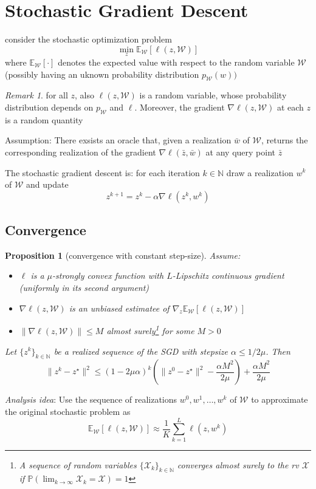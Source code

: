 \documentclass{book}
\newcommand{\N}{\mathbb{N}}
\theoremstyle{theoremv2}
\newtheorem{proposition}{Proposition}[chapter]
\theoremstyle{defv2}
\theoremstyle{remark}
\newtheorem*{remark}{Remark}
\theoremstyle{remark}
\theoremstyle{definition}
\theoremstyle{definition}
\begin{document}
\section{Stochastic Gradient Descent}
consider the stochastic optimization problem 
\[
    \min_z \mathbb{E}_{\mathcal{W}}[\ell(z,\mathcal{W})]
\]
where $\mathbb{E}_{\mathcal{W}}[\cdot]$ denotes the expected value with respect to the random variable $\mathcal{W}$ (possibly having an uknown probability distribution $p_{\mathcal{W}}(w))$
\begin{remark}
    for all $z$, also $\ell(z,\mathcal{W})$ is a random variable, whose probability distribution depends on $p_{\mathcal{W}}$ and $\ell$. Moreover, the gradient $\nabla\ell(z,\mathcal{W})$ at each $z$ is a random quantity
\end{remark}
Assumption: There exsists an oracle that, given a realization $\bar{w}$ of $\mathcal{W}$, returns the corresponding realization of the gradient $\nabla\ell(\bar{z},\bar{w})$ at any query point $\bar{z}$

The stochastic gradient descent is: for each iteration $k\in\N$ draw a realization $w^k$ of $\mathcal{W}$ and update 
\[
    z^{k+1} = z^k -\alpha\nabla\ell(z^k,w^k)
\]
\subsection{Convergence}
\begin{proposition}[convergence with constant step-size]
    Assume: 
    \begin{itemize}
        \item $\ell$ is a $\mu$-strongly convex function with $L$-Lipschitz continuous gradient (uniformly in its second argument)
        \item $\nabla\ell(z,\mathcal{W})$ is an unbiased estimatee of $\nabla_z\mathbb{E}_{\mathcal{W}}[\ell(z,\mathcal{W})]$
        \item $\|\nabla\ell(z,\mathcal{W})\|\leq M$ almost surely\footnote{A sequence of random variables $\{\mathcal{X}_k\}_{k\in\N}$ converges almost surely to the rv $\mathcal{X}$ if $\mathbb{P}(\lim_{k\to\infty}\mathcal{X}_k=\mathcal{X})=1$} for some $M>0$
    \end{itemize}
    Let $\{z^k\}_{k\in\N}$ be a realized sequence of the SGD with stepsize $\alpha\leq 1/2 \mu$. Then 
    \[
        \|z^k-z^\star\|^2\leq (1-2\mu\alpha)^k\left(\|z^0-z^\star\|^2 - \displaystyle\frac{\alpha M^2}{2\mu}\right) + \displaystyle\frac{\alpha M^2}{2\mu}
    \]
\end{proposition} 
\emph{Analysis idea}: Use the sequence of realizations $w^0,w^1,\dots,w^k$ of $\mathcal{W}$ to approximate the original stochastic problem as 
\[
    \mathbb{E}_{\mathcal{W}}[\ell(z,\mathcal{W})] \approx \displaystyle\frac{1}{K}\displaystyle\sum_{k=1}^{L}\ell(z,w^k)
\]
\end{document}
